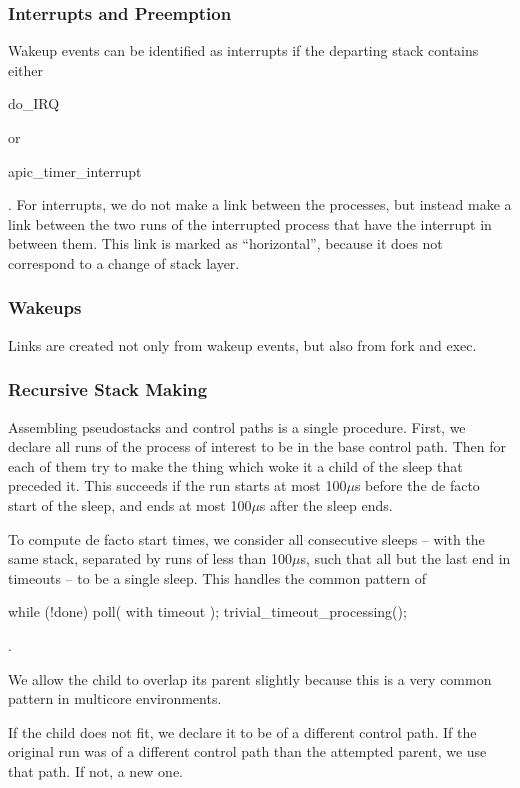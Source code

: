 \documentclass[10pt]{article}
\begin{document}
\subsubsection{Interrupts and Preemption}

Wakeup events can be identified as interrupts if the departing stack contains either \begin{tt}do\_IRQ\end{tt} or\\ \begin{tt}apic\_timer\_interrupt\end{tt}.  For interrupts, we do not make a link between the processes, but instead make a link between the two runs of the interrupted process that have the interrupt in between them.  This link is marked as ``horizontal'', because it does not correspond to a change of stack layer.

\subsubsection{Wakeups}

Links are created not only from wakeup events, but also from fork and exec.

\subsubsection{Recursive Stack Making}

Assembling pseudostacks and control paths is a single procedure.  First, we declare all runs of the process of interest to be in the base control path.  Then for each of them try to make the thing which woke it a child of the sleep that preceded it.  This succeeds if the run starts at most 100$\mu$s before the de facto start of the sleep, and ends at most 100$\mu$s after the sleep ends.  

To compute de facto start times, we consider all consecutive sleeps -- with the same stack, separated by runs of less than 100$\mu$s, such that all but the last end in timeouts -- to be a single sleep.  This handles the common pattern of \begin{tt}while (!done) { poll( with timeout ); trivial\_timeout\_processing(); }\end{tt}.

We allow the child to overlap its parent slightly because this is a very common pattern in multicore environments.

If the child does not fit, we declare it to be of a different control path.  If the original run was of a different control path than the attempted parent, we use that path.  If not, a new one.
\end{document}
